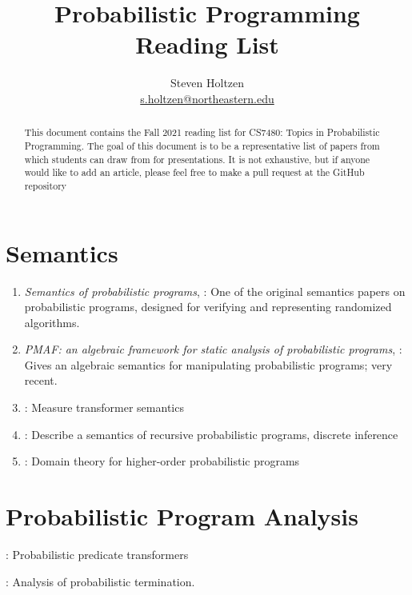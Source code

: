 \documentclass{article}
\title{Probabilistic Programming Reading List}
\author{Steven Holtzen\\\url{s.holtzen@northeastern.edu}}
\begin{document}
\maketitle

\begin{abstract}
  This document contains the Fall 2021 reading list for CS7480: Topics in
  Probabilistic Programming. The goal of this document is to be a representative
  list of papers from which students can draw from for presentations. It is not
  exhaustive, but if anyone would like to add an article, please feel free to
  make a pull request at the GitHub repository 
\end{abstract}

\tableofcontents

\section{Semantics}
\begin{enumerate}
\item \emph{Semantics of probabilistic programs}, \citep{Kozen1981}: One of the
  original semantics papers on probabilistic programs, designed for verifying and
  representing randomized algorithms.
\item \emph{PMAF: an algebraic framework for static analysis of probabilistic
    programs}, \citep{Wang2018}: Gives an algebraic semantics for manipulating
  probabilistic programs; very recent.
\item \citep{Borgstrom2013}: Measure transformer semantics
\item \citep{Scibior2017}: Describe a semantics of recursive probabilistic
  programs, discrete inference
\item \citep{Vakar2019}: Domain theory for higher-order probabilistic programs
\end{enumerate}

\section{Probabilistic Program Analysis}

\item \citep{Morgan1996}: Probabilistic predicate transformers
\item \citep{FerrerFioriti2015}: Analysis of probabilistic termination.
\end{document}
